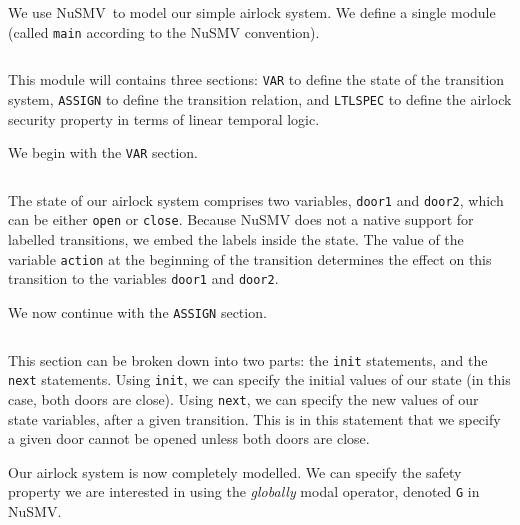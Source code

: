 \begin{example}
  We use NuSMV\,\cite{cimatti2002nusmv} to model our simple airlock system.
  We define a single module (called \texttt{main} according to the NuSMV
  convention).

  \inputminted[firstline=1,lastline=1]{coq}{Listings/Airlock1.nusmv}

  This module will contains three sections: \texttt{VAR} to define the state of
  the transition system, \texttt{ASSIGN} to define the transition relation, and
  \texttt{LTLSPEC} to define the airlock security property in terms of linear
  temporal logic. 

  We begin with the \texttt{VAR} section.

  \inputminted[firstline=3,lastline=7]{coq}{Listings/Airlock1.nusmv}

  The state of our airlock system comprises two variables, \texttt{door1} and
  \texttt{door2}, which can be either \texttt{open} or \texttt{close}.
  Because NuSMV does not  a native support for labelled
  transitions, we embed the labels inside the state.
  The value of the variable \texttt{action} at the beginning of the transition
  determines the effect on this transition  to the variables \texttt{door1} and \texttt{door2}.

  We now continue with the \texttt{ASSIGN} section.

  \inputminted[firstline=9,lastline=31]{coq}{Listings/Airlock1.nusmv}

  This section can be broken down into two parts: the \texttt{init} statements,
  and the \texttt{next} statements.
  Using \texttt{init}, we can specify the initial values of our state (in this
  case, both doors are close).
  Using \texttt{next}, we can specify the new values of our state variables,
  after a given transition.
  This is in this statement that we specify a given door cannot be opened unless
  both doors are close. 

  Our airlock system is now completely modelled.
  We can specify the safety property we are interested in using the
  \emph{globally} modal operator, denoted \texttt{G} in NuSMV. 

  \inputminted[firstline=33,lastline=33]{coq}{Listings/Airlock1.nusmv}


\end{example}
